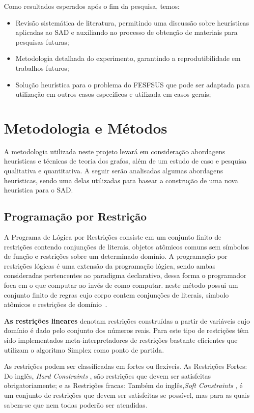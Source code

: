 Como resultados esperados após o fim da pesquisa, temos:

\begin{itemize}
\item Revisão sistemática de literatura, permitindo uma discussão sobre heurísticas aplicadas ao \ac{SAD} e auxiliando no processo de obtenção de materiais para pesquisas futuras;
\item Metodologia detalhada do experimento, garantindo a reprodutibilidade em trabalhos futuros;
\item Solução heurística para o problema do \ac{FESFSUS} que pode ser adaptada para utilização em outros casos específicos e utilizada em casos gerais;
\end{itemize}

\section{Metodologia e Métodos}

A metodologia utilizada neste projeto levará em consideração abordagens heurísticas e técnicas de teoria dos grafos, além de um estudo de caso e pesquisa qualitativa e quantitativa.
A seguir serão analisadas algumas abordagens heurísticas, sendo uma delas utilizadas para basear a construção de uma nova heurística para o \ac{SAD}. 

\subsection{Programação por Restrição}

A Programa de Lógica por Restrições consiste em um conjunto finito de restrições contendo conjunções de literais, objetos atômicos comuns sem símbolos de função e restrições sobre um determinado domínio. A programação por restrições lógicas é uma extensão da programação lógica, sendo ambas consideradas pertencentes ao paradigma declarativo, dessa forma o programador foca em o que computar ao invés de como computar. neste método possui um conjunto finito de regras cujo corpo contem conjunções de literais, simbolo atômicos e restrições de domínio~\cite{maria:2008}.

\textbf{As restrições lineares} denotam restrições construídas a partir de variáveis
cujo domínio é dado pelo conjunto dos números reais. Para este tipo de
restrições têm sido implementados meta-interpretadores de restrições bastante
eficientes que utilizam o algoritmo Simplex como ponto de partida.

As restrições podem ser classificadas em fortes ou flexíveis. As Restrições Fortes: Do inglês, \textit{Hard Constraints} , são restrições que devem ser satisfeitas obrigatoriamente; e as Restrições fracas: Também do inglês,\textit{Soft Constraints} , é um conjunto de restrições que devem ser satisfeitas se possível, mas para as quais sabem-se que nem todas poderão ser atendidas.

